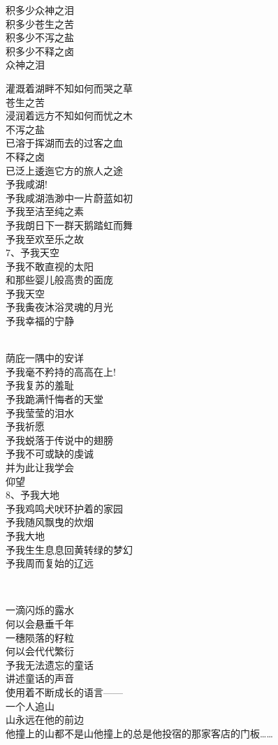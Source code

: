 \documentclass{article}
\begin{document}
积多少众神之泪\\
积多少苍生之苦\\
积多少不泻之盐
\\
积多少不释之卤 \\ 


众神之泪\\
\newpage

灌溉着湖畔不知如何而哭之草\\
苍生之苦\\
浸润着远方不知如何而忧之木\\
不泻之盐\\
已溶于挥湖而去的过客之血\\
不释之卤
\\
已泛上逶迤它方的旅人之途 \\ 


予我咸湖!\\
予我咸湖浩渺中一片蔚蓝如初\\
予我至洁至纯之素\\
予我朗日下一群天鹅踏虹而舞
\\
予我至欢至乐之故 \\ 


7、予我天空\\
予我不敢直视的太阳
\\
和那些婴儿般高贵的面庞 \\ 


予我天空\\
予我夤夜沐浴灵魂的月光\\
予我幸福的宁静
\newpage

\\
荫庇一隅中的安详 \\ 


予我毫不矜持的高高在上! \\ 


予我复苏的羞耻\\
予我跪满忏悔者的天堂\\
予我莹莹的泪水\\
予我祈愿\\
予我蜕落于传说中的翅膀\\
予我不可或缺的虔诚\\
并为此让我学会
\\
仰望 \\ 


8、予我大地\\
予我鸡鸣犬吠环护着的家园
\\
予我随风飘曳的炊烟 \\ 


予我大地\\
予我生生息息回黄转绿的梦幻
\\
予我周而复始的辽远 \par \\
\newpage

一滴闪烁的露水\\
何以会悬垂千年\\
一穗陨落的籽粒
\\
何以会代代繁衍 \\ 


予我无法遗忘的童话\\
讲述童话的声音\\
使用着不断成长的语言——\\
一个人追山\\
山永远在他的前边\\
他撞上的山都不是山他撞上的总是他投宿的那家客店的门板……
\end{document}
